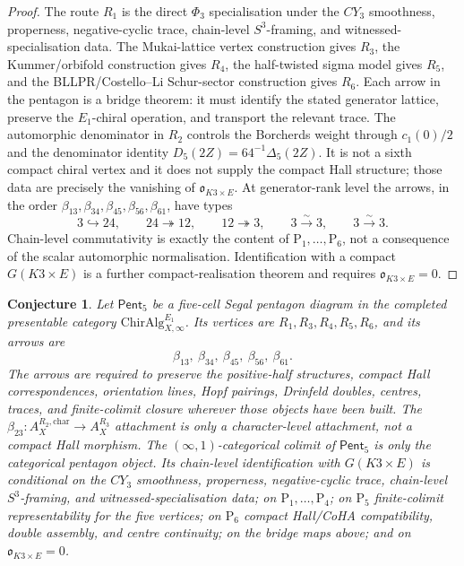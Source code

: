 \documentclass[11pt]{amsart}
\newtheorem{conjecture}[theorem]{Conjecture}
\theoremstyle{definition}
\theoremstyle{remark}
\begin{document}
\begin{proof}
The route \(R_1\) is the direct \(\Phi_3\) specialisation under the \(CY_3\)
smoothness, properness, negative-cyclic trace, chain-level \(S^3\)-framing,
and witnessed-specialisation data. The Mukai-lattice vertex construction
gives \(R_3\), the Kummer/orbifold construction gives \(R_4\), the
half-twisted sigma model gives \(R_5\), and the BLLPR/Costello--Li
Schur-sector construction gives \(R_6\). Each arrow in the pentagon is a
bridge theorem: it must identify the stated generator lattice, preserve the
\(E_1\)-chiral operation, and transport the relevant trace. The automorphic
denominator in \(R_2\) controls the Borcherds weight through \(c_1(0)/2\)
and the denominator identity \(D_5(2Z)=64^{-1}\Delta_5(2Z)\). It is not a
sixth compact chiral vertex and it does not supply the compact Hall
structure; those data are precisely the vanishing of
\(\mathfrak{o}_{K3\times E}\).
At generator-rank level the arrows, in the order
\(\beta_{13},\beta_{34},\beta_{45},\beta_{56},\beta_{61}\), have types
\[
        3\hookrightarrow 24,\qquad
        24\twoheadrightarrow 12,\qquad
        12\twoheadrightarrow 3,\qquad
        3\xrightarrow{\sim}3,\qquad
        3\xrightarrow{\sim}3 .
\]
Chain-level commutativity is exactly the content of
\(\mathrm{P}_1,\ldots,\mathrm{P}_6\), not a consequence of the scalar
automorphic normalisation. Identification with a compact
\(G(K3\times E)\) is a further compact-realisation theorem and requires
\(\mathfrak{o}_{K3\times E}=0\).
\end{proof}

\begin{conjecture}
Let \(\mathsf{Pent}_5\) be a five-cell Segal pentagon diagram in the
completed presentable category \(\mathrm{ChirAlg}^{E_1}_{X,\infty}\).
Its vertices are \(R_1,R_3,R_4,R_5,R_6\), and its arrows are
\[
        \beta_{13},\ \beta_{34},\ \beta_{45},\ \beta_{56},\ \beta_{61}.
\]
The arrows are required to preserve the positive-half structures, compact
Hall correspondences, orientation lines, Hopf pairings, Drinfeld doubles,
centres, traces, and finite-colimit closure wherever those objects have
been built. The
\(\beta_{23}:A_X^{R_2,\mathrm{char}}\to A_X^{R_3}\) attachment is only a
character-level attachment, not a compact Hall morphism. The
\((\infty,1)\)-categorical colimit of \(\mathsf{Pent}_5\) is only the
categorical pentagon object. Its
chain-level identification with \(G(K3\times E)\) is conditional on the
\(CY_3\) smoothness, properness, negative-cyclic trace, chain-level
\(S^3\)-framing, and witnessed-specialisation data; on
\(\mathrm{P}_1,\ldots,\mathrm{P}_4\); on \(\mathrm{P}_5\) finite-colimit
representability for the five vertices; on \(\mathrm{P}_6\) compact
Hall/CoHA compatibility, double assembly, and centre continuity; on the
bridge maps above; and on
\(\mathfrak{o}_{K3\times E}=0\).
\end{conjecture}
\end{document}
